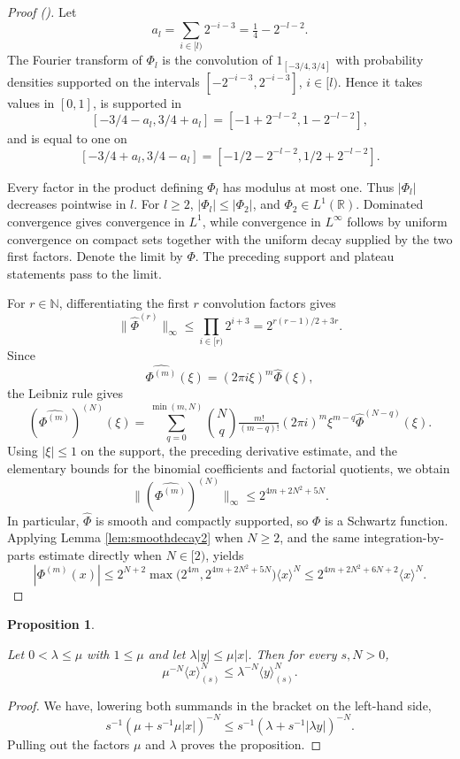 \documentclass[12pt,reqno]{amsart}
\newcommand{\auto}{{({\tiny\faCar})}}
\theoremstyle{plain}
\newtheorem{proposition}[theorem]{Proposition}
\numberwithin{equation}{section}
\theoremstyle{remark}
\newcommand{\uses}[1]{}
\newcommand{\usesdefs}[1]{}
\newcommand{\leanok}{}
\newcommand{\lean}[1]{}
\newcommand{\R}{{\mathbb R}}
\newcommand{\N}{{\mathbb N}}
\begin{document}
\begin{proof}[Proof \auto]
Let
\[
a_l=\sum_{i\in[l)}2^{-i-3}=\tfrac14-2^{-l-2}.
\]
The Fourier transform of $\Phi_l$ is the convolution of $1_{[-3/4,3/4]}$ with probability densities supported on the intervals $[-2^{-i-3},2^{-i-3}]$, $i\in[l)$. Hence it takes values in $[0,1]$, is supported in
\[
[-3/4-a_l,3/4+a_l]=[-1+2^{-l-2},1-2^{-l-2}],
\]
and is equal to one on
\[
[-3/4+a_l,3/4-a_l]=[-1/2-2^{-l-2},1/2+2^{-l-2}].
\]

Every factor in the product defining $\Phi_l$ has modulus at most one. Thus $|\Phi_l|$ decreases pointwise in $l$. For $l\ge2$, $|\Phi_l|\le|\Phi_2|$, and $\Phi_2\in L^1(\R)$. Dominated convergence gives convergence in $L^1$, while convergence in $L^\infty$ follows by uniform convergence on compact sets together with the uniform decay supplied by the two first factors. Denote the limit by $\Phi$. The preceding support and plateau statements pass to the limit.

For $r\in\N$, differentiating the first $r$ convolution factors gives
\[
\|\widehat\Phi^{(r)}\|_\infty
\le\prod_{i\in[r)}2^{i+3}
=2^{r(r-1)/2+3r}.
\]
Since
\[
\widehat{\Phi^{(m)}}(\xi)=(2\pi i\xi)^m\widehat\Phi(\xi),
\]
the Leibniz rule gives
\[
(\widehat{\Phi^{(m)}})^{(N)}(\xi)
=
\sum_{q=0}^{\min(m,N)}
\binom{N}{q}\tfrac{m!}{(m-q)!}(2\pi i)^m
\xi^{m-q}\widehat\Phi^{(N-q)}(\xi).
\]
Using $|\xi|\le1$ on the support, the preceding derivative estimate, and the elementary bounds for the binomial coefficients and factorial quotients, we obtain
\[
\|(\widehat{\Phi^{(m)}})^{(N)}\|_\infty
\le2^{4m+2N^2+5N}.
\]
In particular, $\widehat\Phi$ is smooth and compactly supported, so $\Phi$ is a Schwartz function. Applying Lemma \ref{lem:smoothdecay2} when $N\ge2$, and the same integration-by-parts estimate directly when $N\in[2)$, yields
\[
|\Phi^{(m)}(x)|
\le2^{N+2}\max\bigl(2^{4m},2^{4m+2N^2+5N}\bigr)\langle x\rangle^N
\le2^{4m+2N^2+6N+2}\langle x\rangle^N.
\]
\end{proof}


\begin{proposition}\label{compare brackets}\uses{}\usesdefs{bracket bump}
\lean{Auto.compare_brackets}
\leanok
Let $0<\lambda\le\mu$ with $1\le\mu$ and let $\lambda|y|\le\mu|x|$. Then for every $s,N>0$,
\begin{equation}\label{compare brackets estimate}
\mu^{-N}\langle x\rangle_{(s)}^N\le\lambda^{-N}\langle y\rangle_{(s)}^N.
\end{equation}
\end{proposition}
\begin{proof}
We have, lowering both summands in the bracket on the left-hand side,
\[
s^{-1}(\mu+s^{-1}\mu|x|)^{-N}
\le s^{-1}(\lambda+s^{-1}|\lambda y|)^{-N}.
\]
Pulling out the factors $\mu$ and $\lambda$ proves the proposition.
\end{proof}
\end{document}
